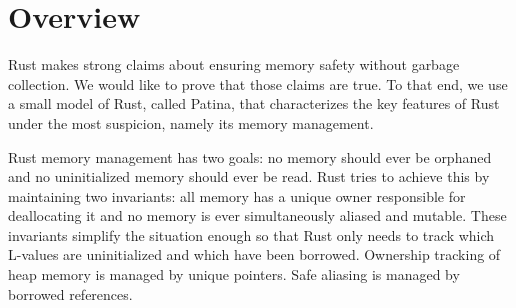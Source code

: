 


\section*{Overview}
Rust makes strong claims about ensuring memory safety without garbage collection.
We would like to prove that those claims are true.
To that end, we use a small model of Rust, called Patina, that characterizes the key
features of Rust under the most suspicion, namely its memory management.

Rust memory management has two goals:
no memory should ever be orphaned and no uninitialized memory should ever be read.
Rust tries to achieve this by maintaining two invariants:
all memory has a unique owner responsible for deallocating it and
no memory is ever simultaneously aliased and mutable.
These invariants simplify the situation enough so that
Rust only needs to track which L-values are uninitialized and which have been borrowed.
Ownership tracking of heap memory is managed by unique pointers.
Safe aliasing is managed by borrowed references.

